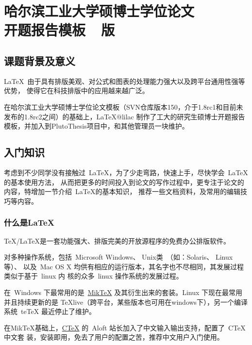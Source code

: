 
\chapter*{哈尔滨工业大学硕博士学位论文\\开题报告模板~\version~版}


\section{课题背景及意义}
\label{Introduction:background}


\LaTeX~由于具有排版美观、对公式和图表的处理能力强大以及跨平台通用性强等优势，
使得它在科技排版中的应用越来越广泛。


在哈尔滨工业大学硕博士学位论文模板（SVN仓库版本150，介于1.8rc1和目前未发布的1.8rc2之间）的基础上，LaTeX@lilac
制作了工大的研究生硕博士开题报告模板，并加入到PlutoThesis项目中，和其他管理员一块维护。

\section{入门知识}
\label{sec:learningknowledge}
考虑到不少同学没有接触过~\LaTeX{}，为了少走弯路，快速上手，尽快学会~\LaTeX{}的基本使用方法，
从而把更多的时间投入到论文的写作过程中，更专注于论文的内容，特增加一节介绍~\LaTeX 的基本知识，
推荐一些文档资料，及常用的编辑技巧等内容。

\subsection{什么是\LaTeX{}}
\label{sec:whatislatex}
   \TeX/\LaTeX 是一套功能强大、排版完美的开放源程序的免费办公排版软件。

    对多种操作系统，包括~Microsoft Windows、 Unix类~（如：Solaris、 Linux 等）、 %
以及~Mac OS X 均供有相应的运行版本，其名字也不尽相同，其发展过程类似于基于~linux 内
核的众多~linux 操作系统的发展过程。

   在~Windows 下最常用的是~\href{http://www.miktex.org}{MikTeX} 及其衍生出来的套装。Linux 下现在最常用并且持续更新的是
TeXlive（跨平台，某些版本也可用在windows下），另一个编译系统~teTeX 最近停止了维护。

  在MikTeX基础上，\href{http://www.ctex.org}{CTeX} 的~Aloft 站长加入了中文输入输出支持，配置了~CTeX 中文套
装，安装即用，免去了用户的配置之苦，推荐中文用户入门使用。

